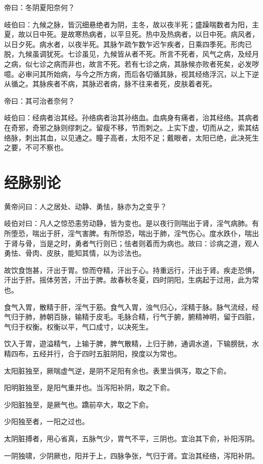 \documentclass{article}%
\begin{document}
帝曰：冬阴夏阳奈何？

岐伯曰：九候之脉，皆沉细悬绝者为阴，主冬，故以夜半死；盛躁喘数者为阳，主夏，故以日中死。是故寒热病者，以平旦死。热中及热病者，以日中死。病风者，以日夕死。病水者，以夜半死。其脉乍疏乍数乍迟乍疾者，日乘四季死。形肉已脱，九候虽调犹死。七诊虽见，九候皆从者不死。所言不死者，风气之病，及经月之病，似七诊之病而非也，故言不死。若有七诊之病，其脉候亦败者死矣，必发哕噫。必审问其所始病，与今之所方病，而后各切循其脉，视其经络浮沉，以上下逆从循之。其脉疾者不病，其脉迟者病，脉不往来者死，皮肤着者死。

帝曰：其可治者奈何？

岐伯曰：经病者治其经。孙络病者治其孙络血。血病身有痛者，治其经络。其病者在奇邪，奇邪之脉则缪刺之。留瘦不移，节而刺之。上实下虚，切而从之，索其结络脉，刺出其血，以见通之。瞳子高者，太阳不足；戴眼者，太阳已绝，此决死生之要，不可不察也。
\section{经脉别论}
黄帝问曰：人之居处、动静、勇怯，脉亦为之变乎？

岐伯对曰：凡人之惊恐恚劳动静，皆为变也。是以夜行则喘出于肾，淫气病肺。有所堕恐，喘出于肝，淫气害脾。有所惊恐，喘出于肺，淫气伤心。度水跌仆，喘出于肾与骨，当是之时，勇者气行则已；怯者则着而为病也。故曰：诊病之道，观人勇怯、骨肉、皮肤，能知其情，以为诊法也。

故饮食饱甚，汗出于胃。惊而夺精，汗出于心。持重远行，汗出于肾。疾走恐惧，汗出于肝。摇体劳苦，汗出于脾。故春秋冬夏，四时阴阳，生病起于过用，此为常也。

食气入胃，散精于肝，淫气于筋。食气入胃，浊气归心，淫精于脉。脉气流经，经气归于肺，肺朝百脉，输精于皮毛。毛脉合精，行气于腑，腑精神明，留于四脏，气归于权衡。权衡以平，气口成寸，以决死生。

饮入于胃，遊溢精气，上输于脾，脾气散精，上归于肺，通调水道，下输膀胱，水精四布，五经并行，合于四时五脏阴阳，揆度以为常也。

太阳脏独至，厥喘虚气逆，是阴不足阳有余也。表里当俱泻，取之下俞。

阳明脏独至，是阳气重并也。当泻阳补阴，取之下俞。

少阳脏独至，是厥气也。蹻前卒大，取之下俞。

少阳独至者，一阳之过也。

太阴脏搏者，用心省真，五脉气少，胃气不平，三阴也。宜治其下俞，补阳泻阴。

一阴独啸，少阴厥也，阳并于上，四脉争张，气归于肾。宜治其经络，泻阳补阴。
\end{document}

